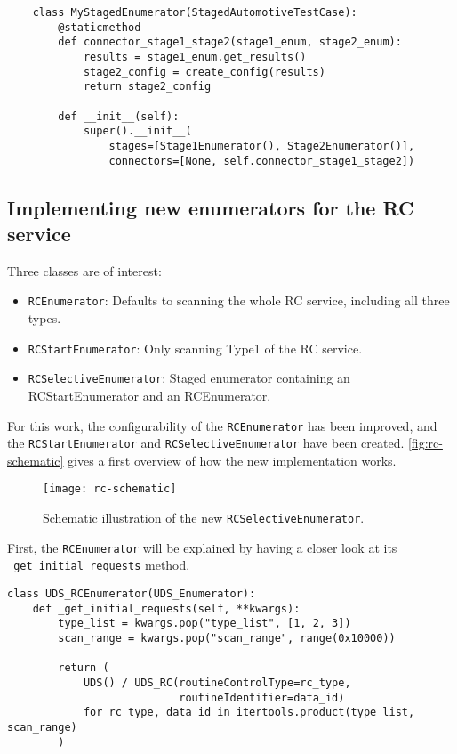 \begin{samepage}
\begin{verbatim}
    class MyStagedEnumerator(StagedAutomotiveTestCase):
        @staticmethod
        def connector_stage1_stage2(stage1_enum, stage2_enum):
            results = stage1_enum.get_results()
            stage2_config = create_config(results)
            return stage2_config
        
        def __init__(self):
            super().__init__(
                stages=[Stage1Enumerator(), Stage2Enumerator()],
                connectors=[None, self.connector_stage1_stage2])
\end{verbatim}
\end{samepage}

\subsection{Implementing new enumerators for the RC service}

Three classes are of interest:

\begin{itemize}
    \item \texttt{RCEnumerator}: Defaults to scanning the whole RC service, including all three types.
    \item \texttt{RCStartEnumerator}: Only scanning Type1 of the RC service.
    \item \texttt{RCSelectiveEnumerator}: Staged enumerator containing an RCStartEnumerator and an RCEnumerator.
\end{itemize}

For this work, the configurability of the \texttt{RCEnumerator} has been improved, and the \texttt{RCStartEnumerator} and \texttt{RCSelectiveEnumerator} have been created. \autoref{fig:rc-schematic} gives a first overview of how the new implementation works.

\begin{figure}[h]
    \centering
    \texttt{[image: rc-schematic]}
    \caption{Schematic illustration of the new \texttt{RCSelectiveEnumerator}.}
    \label{fig:rc-schematic}
\end{figure}

First, the \texttt{RCEnumerator} will be explained by having a closer look at its \texttt{_get_initial_requests} method.

\begin{samepage}
\begin{verbatim}
class UDS_RCEnumerator(UDS_Enumerator):
    def _get_initial_requests(self, **kwargs):
        type_list = kwargs.pop("type_list", [1, 2, 3])
        scan_range = kwargs.pop("scan_range", range(0x10000))

        return (
            UDS() / UDS_RC(routineControlType=rc_type,
                           routineIdentifier=data_id)
            for rc_type, data_id in itertools.product(type_list, scan_range)
        )
\end{verbatim}
\end{samepage}

